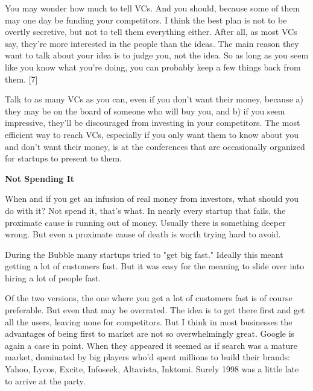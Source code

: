 You
                    may wonder how much to tell VCs. And you should, because
                    some of them may one day be funding your competitors. I
                    think the best plan is not to be overtly secretive, but not
                    to tell them everything either. After all, as most VCs say,
                    they're more interested in the people than the ideas. The
                    main reason they want to talk about your idea is to judge
                    you, not the idea. So as long as you seem like you know what
                    you're doing, you can probably keep a few things back from
                    them. [7]

Talk to as many VCs as you can, even if
                    you don't want their money, because a) they may be on the
                    board of someone who will buy you, and b) if you seem
                    impressive, they'll be discouraged from investing in your
                    competitors. The most efficient way to reach VCs, especially
                    if you only want them to know about you and don't want their
                    money, is at the conferences that are occasionally organized
                    for startups to present to them.

\textbf{Not Spending It}

When and if you get an infusion of real money
                    from investors, what should you do with it? Not spend it,
                    that's what. In nearly every startup that fails, the
                    proximate cause is running out of money. Usually there is
                    something deeper wrong. But even a proximate cause of death
                    is worth trying hard to avoid.

During the Bubble
                    many startups tried to "get big fast." Ideally this meant
                    getting a lot of customers fast. But it was easy for the
                    meaning to slide over into hiring a lot of people fast.

Of
                    the two versions, the one where you get a lot of customers
                    fast is of course preferable. But even that may be
                    overrated. The idea is to get there first and get all the
                    users, leaving none for competitors. But I think in most
                    businesses the advantages of being first to market are not
                    so overwhelmingly great. Google is again a case in point.
                    When they appeared it seemed as if search was a mature
                    market, dominated by big players who'd spent millions to
                    build their brands: Yahoo, Lycos, Excite, Infoseek,
                    Altavista, Inktomi. Surely 1998 was a little late to arrive
                    at the party.

